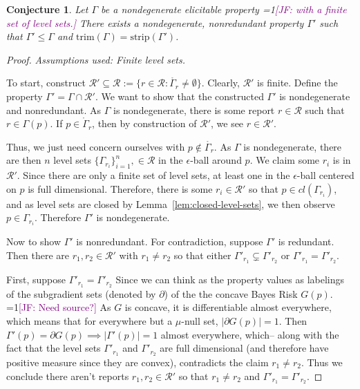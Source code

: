 \documentclass[12pt]{article}
\newcommand{\Comments}{1}
\newcommand{\mynote}[2]{\ifnum\Comments=1\textcolor{#1}{#2}\fi}
\newcommand{\jessie}[1]{\mynote{purple}{[JF: #1]}}
\newcommand{\R}{\mathcal{R}}
\newcommand{\inter}[1]{\mathring{#1}}%
\newcommand{\trim}{\mathrm{trim}}
\newcommand{\strip}{\text{strip}}
\newtheorem{conjecture}{Conjecture}
\begin{document}
\begin{conjecture}\label{conj:gam-prime-exists}
	Let $\Gamma$ be a nondegenerate elicitable property \jessie{with a finite set of level sets.}
	There exists a nondegenerate, nonredundant property $\Gamma'$ such that $\Gamma' \leq \Gamma$ and $\trim(\Gamma) = \strip(\Gamma')$.  
\end{conjecture}
\begin{proof}
\emph{Assumptions used: Finite level sets.}

	To start, construct $\R' \subseteq \R := \{ r \in \R : \inter{\Gamma_r} \neq \emptyset \}$.
	Clearly, $\R'$ is finite.
	Define the property $\Gamma' = \Gamma\cap \R'$.
	We want to show that the constructed $\Gamma'$ is nondegenerate and nonredundant.
	As $\Gamma$ is nondegenerate, there is some report $r \in \R$ such that $r \in \Gamma(p)$.
	If $p \in \inter{\Gamma}_r$, then by construction of $\R'$, we see $r \in \R'$.
	
	Thus, we just need concern ourselves with $p \not \in \inter{\Gamma_r}$.
	As $\Gamma$ is nondegenerate, there are then $n$ level sets $\{\Gamma_{r_i}\}_{i=1}^n, \in \R$ in the $\epsilon$-ball around $p$.
	We claim some $r_i$ is in $\R'$.
	Since there are only a finite set of level sets, at least one in the $\epsilon$-ball centered on $p$ is full dimensional.
	Therefore, there is some $r_i \in \R'$ so that $p \in cl(\Gamma_{r_i})$, and as level sets are closed by Lemma~\ref{lem:closed-level-sets}, we then observe $p \in \Gamma_{r_i}$.
	Therefore $\Gamma'$ is nondegenerate.
	
	Now to show $\Gamma'$ is nonredundant.
	For contradiction, suppose $\Gamma'$ is redundant.
	Then there are $r_1, r_2 \in \R'$ with $r_1 \neq r_2$ so that either $\Gamma'_{r_1} \subsetneq \Gamma'_{r_2}$ or $\Gamma'_{r_1} = \Gamma'_{r_2}$.
	
	First, suppose $\Gamma'_{r_1} = \Gamma'_{r_2}$
	Since we can think as the property values as labelings of the subgradient sets (denoted by $\partial$) of the the concave Bayes Risk $G(p)$.
	\jessie{Need source?}
	As $G$ is concave, it is differentiable almost everywhere, which means that for everywhere but a $\mu$-null set, $|\partial G(p)| = 1$.
	Then $\Gamma'(p) = \partial G(p) \implies |\Gamma'(p)| = 1$ almost everywhere, which-- along with the fact that the level sets $\Gamma'_{r_1}$ and $\Gamma'_{r_2}$ are full dimensional (and therefore have positive measure since they are convex), contradicts the claim $r_1 \neq r_2$.
	Thus we conclude there aren't reports $r_1, r_2 \in \R'$ so that $r_1 \neq r_2$ and $\Gamma'_{r_1} = \Gamma'_{r_2}$.
	

\end{proof}
\end{document}
